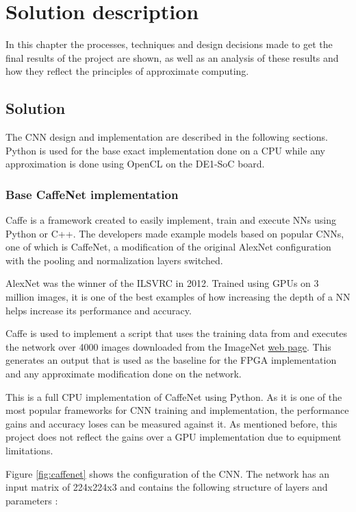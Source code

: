 \chapter{Solution description}

In this chapter the processes, techniques and design decisions made
to get the final results of the project are shown, as well as an analysis
of these results and how they reflect the principles of approximate computing.

\section{Solution}

The CNN design and implementation are described in the following sections.
Python is used for the base exact implementation done on a CPU while any approximation is done
using OpenCL on the DE1-SoC board.

\subsection{Base CaffeNet implementation}

Caffe is a framework created to easily implement, train and execute NNs using Python or C++.
The developers made example models based on popular CNNs, one of which is CaffeNet, a modification of the original
AlexNet configuration with the pooling and normalization layers switched.

AlexNet was the winner of the ILSVRC in 2012. Trained using GPUs on 3 million images, it is one
of the best examples of how increasing the depth of a NN helps increase its performance and accuracy.

Caffe is used to implement a script that uses the training data from \cite{donahue2012bvlc} and executes the network
over 4000 images downloaded from the ImageNet \href{http://image-net.org/}{web page}. This generates an output that is used as the baseline
for the FPGA implementation and any approximate modification done on the network.

This is a full CPU implementation of CaffeNet using Python. As it is one of the most popular frameworks for CNN
training and implementation, the performance gains and accuracy loses can be measured against it. As mentioned
before, this project
does not reflect the gains over a GPU implementation due to equipment limitations.

Figure \ref{fig:caffenet} shows the configuration of the CNN. The network has an input matrix of 224{x}224{x}3
and 
contains the following structure of layers and parameters \cite{reviewalex}:

